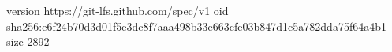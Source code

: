 version https://git-lfs.github.com/spec/v1
oid sha256:e6f24b70d3d01f5e3dc8f7aaa498b33e663cfe03b847d1c5a782dda75f64a4b1
size 2892
